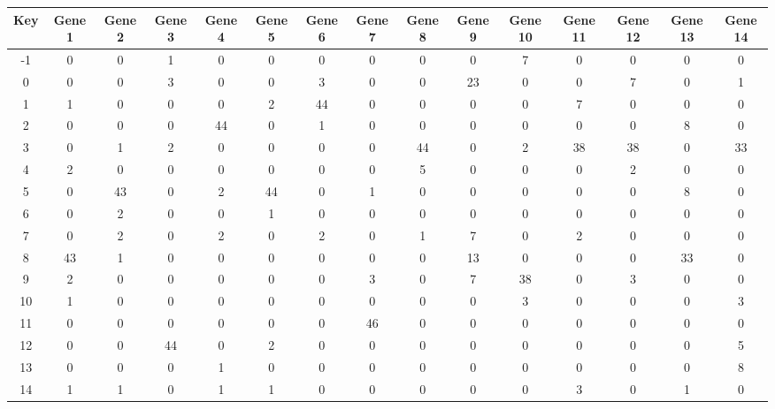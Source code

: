 \begin{tabular}{|c|c|c|c|c|c|c|c|c|c|c|c|c|c|c|}
\hline
Key & Gene 1 & Gene 2 & Gene 3 & Gene 4 & Gene 5 & Gene 6 & Gene 7 & Gene 8 & Gene 9 & Gene 10 & Gene 11 & Gene 12 & Gene 13 & Gene 14 \\
\hline
-1 & 0 & 0 & 1 & 0 & 0 & 0 & 0 & 0 & 0 & 7 & 0 & 0 & 0 & 0 \\
0 & 0 & 0 & 3 & 0 & 0 & 3 & 0 & 0 & 23 & 0 & 0 & 7 & 0 & 1 \\
1 & 1 & 0 & 0 & 0 & 2 & 44 & 0 & 0 & 0 & 0 & 7 & 0 & 0 & 0 \\
2 & 0 & 0 & 0 & 44 & 0 & 1 & 0 & 0 & 0 & 0 & 0 & 0 & 8 & 0 \\
3 & 0 & 1 & 2 & 0 & 0 & 0 & 0 & 44 & 0 & 2 & 38 & 38 & 0 & 33 \\
4 & 2 & 0 & 0 & 0 & 0 & 0 & 0 & 5 & 0 & 0 & 0 & 2 & 0 & 0 \\
5 & 0 & 43 & 0 & 2 & 44 & 0 & 1 & 0 & 0 & 0 & 0 & 0 & 8 & 0 \\
6 & 0 & 2 & 0 & 0 & 1 & 0 & 0 & 0 & 0 & 0 & 0 & 0 & 0 & 0 \\
7 & 0 & 2 & 0 & 2 & 0 & 2 & 0 & 1 & 7 & 0 & 2 & 0 & 0 & 0 \\
8 & 43 & 1 & 0 & 0 & 0 & 0 & 0 & 0 & 13 & 0 & 0 & 0 & 33 & 0 \\
9 & 2 & 0 & 0 & 0 & 0 & 0 & 3 & 0 & 7 & 38 & 0 & 3 & 0 & 0 \\
10 & 1 & 0 & 0 & 0 & 0 & 0 & 0 & 0 & 0 & 3 & 0 & 0 & 0 & 3 \\
11 & 0 & 0 & 0 & 0 & 0 & 0 & 46 & 0 & 0 & 0 & 0 & 0 & 0 & 0 \\
12 & 0 & 0 & 44 & 0 & 2 & 0 & 0 & 0 & 0 & 0 & 0 & 0 & 0 & 5 \\
13 & 0 & 0 & 0 & 1 & 0 & 0 & 0 & 0 & 0 & 0 & 0 & 0 & 0 & 8 \\
14 & 1 & 1 & 0 & 1 & 1 & 0 & 0 & 0 & 0 & 0 & 3 & 0 & 1 & 0 \\
\hline
\end{tabular}